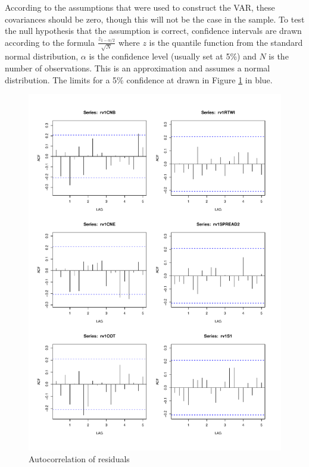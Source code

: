 \documentclass[12pt, a4paper, oneside]{article}\usepackage[]{graphicx}\usepackage[]{color}
\begin{document}
According to the assumptions that were used to construct the VAR, these covariances should be zero, though this will not be the case in the sample.   To test the null hypothesis that the assumption is correct, confidence intervals are drawn according to the formula $\frac{z_{1-\alpha/2}}{\sqrt{N}}$ where $z$ is the quantile function from the standard normal distribution, $\alpha$ is the confidence level (usually set at 5\%) and $N$ is the number of observations.  This is an approximation and assumes a normal distribution.  The limits for a 5\% confidence at drawn in Figure \ref{fig:acf} in blue.   

\begin{figure}[h!]
\graphicspath{{Pictures/C2/}}
\centering
\caption{Autocorrelation of residuals}
\label{fig:acf}
\includegraphics[scale=0.6] {acf}
\end{figure}
\end{document}

